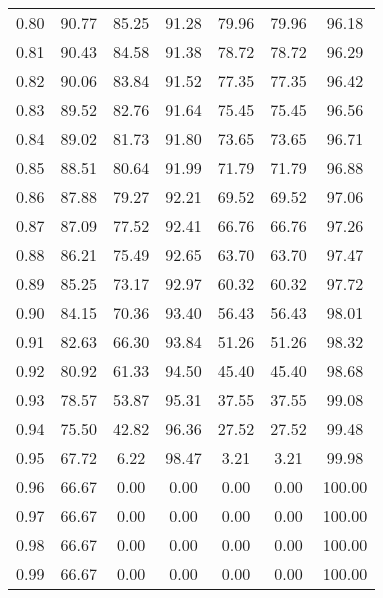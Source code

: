 \begin{tabular}{|c|c|c|c|c|c|c|}
      0.80 &     90.77 &     85.25 &      91.28 &   79.96 &      79.96 &         96.18 \\
      0.81 &     90.43 &     84.58 &      91.38 &   78.72 &      78.72 &         96.29 \\
      0.82 &     90.06 &     83.84 &      91.52 &   77.35 &      77.35 &         96.42 \\
      0.83 &     89.52 &     82.76 &      91.64 &   75.45 &      75.45 &         96.56 \\
      0.84 &     89.02 &     81.73 &      91.80 &   73.65 &      73.65 &         96.71 \\
      0.85 &     88.51 &     80.64 &      91.99 &   71.79 &      71.79 &         96.88 \\
      0.86 &     87.88 &     79.27 &      92.21 &   69.52 &      69.52 &         97.06 \\
      0.87 &     87.09 &     77.52 &      92.41 &   66.76 &      66.76 &         97.26 \\
      0.88 &     86.21 &     75.49 &      92.65 &   63.70 &      63.70 &         97.47 \\
      0.89 &     85.25 &     73.17 &      92.97 &   60.32 &      60.32 &         97.72 \\
      0.90 &     84.15 &     70.36 &      93.40 &   56.43 &      56.43 &         98.01 \\
      0.91 &     82.63 &     66.30 &      93.84 &   51.26 &      51.26 &         98.32 \\
      0.92 &     80.92 &     61.33 &      94.50 &   45.40 &      45.40 &         98.68 \\
      0.93 &     78.57 &     53.87 &      95.31 &   37.55 &      37.55 &         99.08 \\
      0.94 &     75.50 &     42.82 &      96.36 &   27.52 &      27.52 &         99.48 \\
      0.95 &     67.72 &      6.22 &      98.47 &    3.21 &       3.21 &         99.98 \\
      0.96 &     66.67 &      0.00 &       0.00 &    0.00 &       0.00 &        100.00 \\
      0.97 &     66.67 &      0.00 &       0.00 &    0.00 &       0.00 &        100.00 \\
      0.98 &     66.67 &      0.00 &       0.00 &    0.00 &       0.00 &        100.00 \\
      0.99 &     66.67 &      0.00 &       0.00 &    0.00 &       0.00 &        100.00 \\
\bottomrule
\end{tabular}
